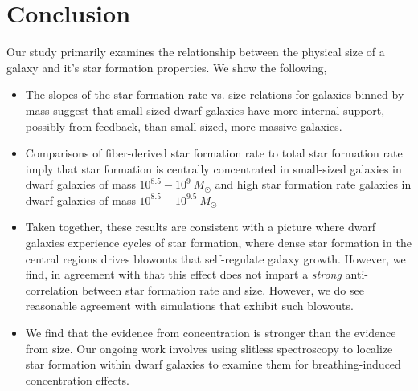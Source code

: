 \documentclass[iop]{emulateapj}
\begin{document}
\section{Conclusion}

Our study primarily examines the relationship between the physical size of a galaxy and it's star formation properties. We show the following,

\begin{itemize}
\item The slopes of the star formation rate vs. size relations for galaxies binned by mass suggest that small-sized dwarf galaxies have more internal support, possibly from feedback, than small-sized, more massive galaxies.

\item Comparisons of fiber-derived star formation rate to total star formation rate imply that star formation is centrally concentrated in small-sized galaxies in dwarf galaxies of mass $10^{8.5}-10^{9} \  M_{\odot}$ and high star formation rate galaxies in dwarf galaxies of mass $10^{8.5}-10^{9.5} \  M_{\odot}$

\item Taken together, these results are consistent with a picture where dwarf galaxies experience cycles of star formation, where dense star formation in the central regions drives blowouts that self-regulate galaxy growth. However, we find, in agreement with \citet{Patel18} that this effect does not impart a \textit{strong} anti-correlation between star formation rate and size. However, we do see reasonable agreement with simulations that exhibit such blowouts.

\item We find that the evidence from concentration is stronger than the evidence from size. Our ongoing work involves using slitless spectroscopy to localize star formation within dwarf galaxies to examine them for breathing-induced concentration effects.

\end{itemize}





\end{document}
